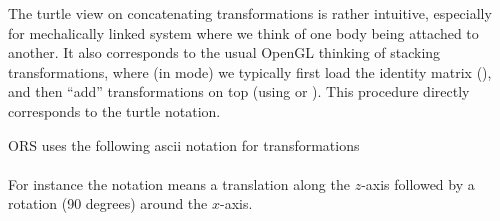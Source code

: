 The turtle view on concatenating transformations is rather intuitive,
especially for mechalically linked system where we think of one body
being attached to another. It also corresponds to the usual OpenGL
thinking of stacking transformations, where (in
 mode) we typically first load the identity
matrix (), and then ``add'' transformations
on top (using  or ). This
procedure directly corresponds to the turtle notation.

ORS uses the following ascii notation for transformations\\
\\
For instance the notation  means a
translation along the $z$-axis followed by a rotation (90 degrees)
around the $x$-axis.



